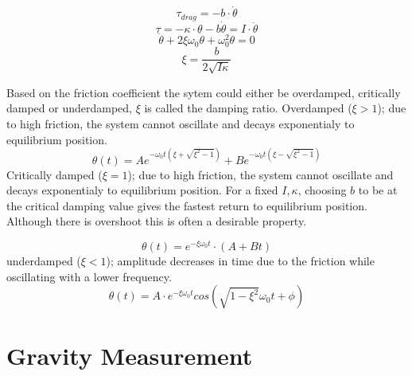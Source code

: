 \documentclass[\main/master.tex]{subfiles}
\begin{document}
\begin{equation}
\tau_{drag} = -b\cdot\dot{\theta}   \label{eqn:friction_tourqe}
\end{equation} 
\begin{equation}
\tau = -\kappa\cdot\theta - b\dot{\theta}  = I\cdot\ddot{\theta}   \label{eqn:damped_motion_equation}
\end{equation} 
\begin{equation}
\ddot{\theta} + 2\xi\omega_0\dot{\theta} + \omega_0^2\theta = 0   \label{eqn:damped_motion_equation}
\end{equation}
\begin{equation}
\xi = \frac{b}{2\sqrt{I\kappa}}   \label{eqn:damped_motion_equation}
\end{equation}

Based on the friction coefficient the sytem could either be overdamped, critically damped or underdamped, $\xi$ is called the damping ratio. Overdamped ($\xi > 1$); due to high friction, the system cannot oscillate and decays exponentialy to equilibrium position.
\begin{equation}
\theta(t) = Ae^{-\omega_0 t(\xi+\sqrt{\xi^2-1})} + Be^{-\omega_0 t(\xi-\sqrt{\xi^2-1})}    \label{eqn:overdamped_motion_equation}
\end{equation}
Critically damped ($\xi = 1$); due to high friction, the system cannot oscillate and decays exponentialy to equilibrium position. For a fixed $I, \kappa$, choosing $b$ to be at the critical damping value gives
the fastest return to equilibrium position. Although there is overshoot this is often a desirable property.

\begin{equation}
\theta(t) = e^{-\xi\omega_0 t}\cdot(A+Bt)     \label{eqn:underdamped_motion_equation}
\end{equation}
 underdamped ($\xi < 1$); amplitude decreases in time due to the friction while oscillating with a lower frequency.
\begin{equation}
\theta(t) = A\cdot e^{-\xi\omega_0 t}cos(\sqrt{1-\xi^2}\omega_0 t +\phi)    \label{eqn:underdamped_motion_equation}
\end{equation}

\color{black}




\section{Gravity Measurement}
\end{document}
